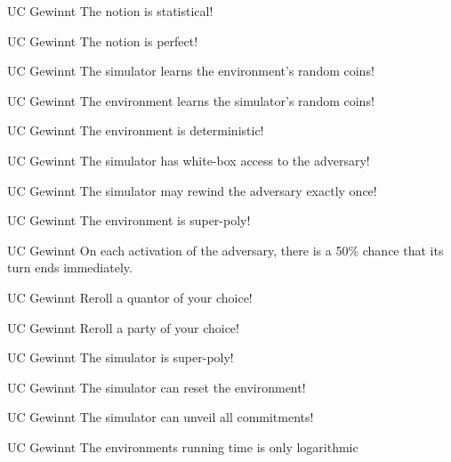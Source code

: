 \documentclass[avery5371,frame,grid]{flashcards}
\begin{document}
\begin{flashcard}{UC Gewinnt}
  The notion is statistical!
\end{flashcard}
\begin{flashcard}{UC Gewinnt}
  The notion is perfect!
\end{flashcard}
\begin{flashcard}{UC Gewinnt}
  The simulator learns the environment's random coins!
\end{flashcard}
\begin{flashcard}{UC Gewinnt}
  The environment learns the simulator's random coins!
\end{flashcard}
\begin{flashcard}{UC Gewinnt}
  The environment is deterministic!
\end{flashcard}
\begin{flashcard}{UC Gewinnt}
  The simulator has white-box access to the adversary!
\end{flashcard}
\begin{flashcard}{UC Gewinnt}
  The simulator may rewind the adversary exactly once!
\end{flashcard}
\begin{flashcard}{UC Gewinnt}
  The environment is super-poly!
\end{flashcard}
\begin{flashcard}{UC Gewinnt}
  On each activation of the adversary, there is a 50\% chance that its turn ends immediately. 
\end{flashcard}
\begin{flashcard}{UC Gewinnt}
  Reroll a quantor of your choice!
\end{flashcard}
\begin{flashcard}{UC Gewinnt}
  Reroll a party of your choice!
\end{flashcard}
\begin{flashcard}{UC Gewinnt}
  The simulator is super-poly!
\end{flashcard}
\begin{flashcard}{UC Gewinnt}
  The simulator can reset the environment!
\end{flashcard}
\begin{flashcard}{UC Gewinnt}
  The simulator can unveil all commitments!
\end{flashcard}
\begin{flashcard}{UC Gewinnt}
  The environments running time is only logarithmic
\end{flashcard}
\end{document}
